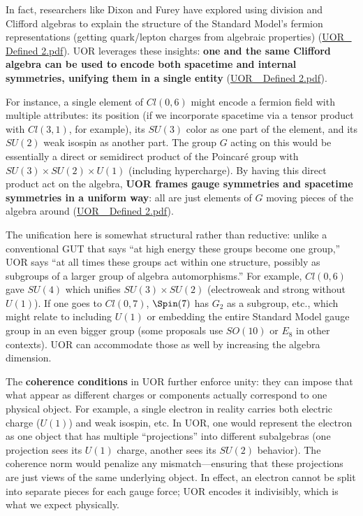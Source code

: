 \documentclass[12pt]{article}
\begin{document}
\medskip

In fact, researchers like Dixon and Furey have explored using division and Clifford algebras to explain the structure of the Standard Model’s fermion representations (getting quark/lepton charges from algebraic properties) (\href{file://file-TBF3nHDaRR5QeVMmwCFYkp#:~:text=automorphisms%20,representations%20can%20be%20realized%20by}{UOR\_ Defined 2.pdf}). UOR leverages these insights: \textbf{one and the same Clifford algebra can be used to encode both spacetime and internal symmetries, unifying them in a single entity} (\href{file://file-TBF3nHDaRR5QeVMmwCFYkp#:~:text=Cosmo%20Const%20Proof%20Supp1,Such%20an%20approach%20aligns%20with}{UOR\_ Defined 2.pdf}).

\medskip

For instance, a single element of $Cl(0,6)$ might encode a fermion field with multiple attributes: its position (if we incorporate spacetime via a tensor product with $Cl(3,1)$, for example), its $SU(3)$ color as one part of the element, and its $SU(2)$ weak isospin as another part. The group $G$ acting on this would be essentially a direct or semidirect product of the Poincaré group with $SU(3)\times SU(2)\times U(1)$ (including hypercharge). By having this direct product act on the algebra, \textbf{UOR frames gauge symmetries and spacetime symmetries in a uniform way}: all are just elements of $G$ moving pieces of the algebra around (\href{file://file-TBF3nHDaRR5QeVMmwCFYkp#:~:text=Cosmo%20Const%20Proof%20Supp1,Such%20an%20approach%20aligns%20with}{UOR\_ Defined 2.pdf}).

\medskip

The unification here is somewhat structural rather than reductive: unlike a conventional GUT that says “at high energy these groups become one group,” UOR says “at all times these groups act within one structure, possibly as subgroups of a larger group of algebra automorphisms.” For example, $Cl(0,6)$ gave $SU(4)$ which unifies $SU(3)\times SU(2)$ (electroweak and strong without $U(1)$). If one goes to $Cl(0,7)$, $\Spin(7)$ has $G_2$ as a subgroup, etc., which might relate to including $U(1)$ or embedding the entire Standard Model gauge group in an even bigger group (some proposals use $SO(10)$ or $E_8$ in other contexts). UOR can accommodate those as well by increasing the algebra dimension.

\medskip

The \textbf{coherence conditions} in UOR further enforce unity: they can impose that what appear as different charges or components actually correspond to one physical object. For example, a single electron in reality carries both electric charge ($U(1)$) and weak isospin, etc. In UOR, one would represent the electron as one object that has multiple ``projections'' into different subalgebras (one projection sees its $U(1)$ charge, another sees its $SU(2)$ behavior). The coherence norm would penalize any mismatch---ensuring that these projections are just views of the same underlying object. In effect, an electron cannot be split into separate pieces for each gauge force; UOR encodes it indivisibly, which is what we expect physically.
\end{document}

